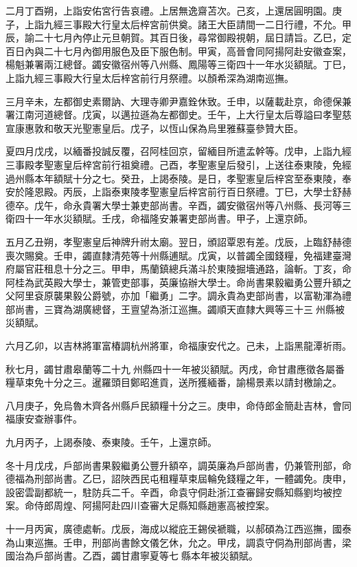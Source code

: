 \begin{pinyinscope}
二月丁酉朔，上詣安佑宮行告哀禮。上居無逸齋苫次。己亥，上還居圓明園。庚子，上詣九經三事殿大行皇太后梓宮前供奠。諸王大臣請間一二日行禮，不允。甲辰，諭二十七月內停止元旦朝賀。其百日後，尋常御殿視朝，屆日請旨。乙巳，定百日內與二十七月內御用服色及臣下服色制。甲寅，高晉會同阿揚阿赴安徽查案，楊魁兼署兩江總督。蠲安徽宿州等八州縣、鳳陽等三衛四十一年水災額賦。丁巳，上詣九經三事殿大行皇太后梓宮前行月祭禮。以顏希深為湖南巡撫。

三月辛未，左都御史素爾訥、大理寺卿尹嘉銓休致。壬申，以薩載赴京，命德保兼署江南河道總督。戊寅，以邁拉遜為左都御史。壬午，上大行皇太后尊謚曰孝聖慈宣康惠敦和敬天光聖憲皇后。戊子，以恆山保為烏里雅蘇臺參贊大臣。

夏四月戊戌，以緬番投誠反覆，召阿桂回京，留緬目所遣孟幹等。戊申，上詣九經三事殿孝聖憲皇后梓宮前行祖奠禮。己酉，孝聖憲皇后發引，上送往泰東陵，免經過州縣本年額賦十分之七。癸丑，上謁泰陵。是日，孝聖憲皇后梓宮至泰東陵，奉安於隆恩殿。丙辰，上詣泰東陵孝聖憲皇后梓宮前行百日祭禮。丁巳，大學士舒赫德卒。戊午，命永貴署大學士兼吏部尚書。辛酉，蠲安徽宿州等八州縣、長河等三衛四十一年水災額賦。壬戌，命福隆安兼署吏部尚書。甲子，上還京師。

五月乙丑朔，孝聖憲皇后神牌升祔太廟。翌日，頒詔覃恩有差。戊辰，上臨舒赫德喪次賜奠。壬申，蠲直隸清苑等十州縣逋賦。戊寅，以普蠲全國錢糧，免福建臺灣府屬官莊租息十分之三。甲申，馬蘭鎮總兵滿斗於東陵掘墻通路，論斬。丁亥，命阿桂為武英殿大學士，兼管吏部事，英廉協辦大學士。命尚書果毅繼勇公豐升額之父阿里袞原襲果毅公爵號，亦加「繼勇」二字。調永貴為吏部尚書，以富勒渾為禮部尚書，三寶為湖廣總督，王亶望為浙江巡撫。蠲順天直隸大興等三十三州縣被災額賦。

六月乙卯，以吉林將軍富椿調杭州將軍，命福康安代之。己未，上詣黑龍潭祈雨。

秋七月，蠲甘肅皋蘭等二十九州縣四十一年被災額賦。丙戌，命甘肅應徵各屬番糧草束免十分之三。暹羅頭目鄭昭進貢，送所獲緬番，諭楊景素以請封檄諭之。

八月庚子，免烏魯木齊各州縣戶民額糧十分之三。庚申，命侍郎金簡赴吉林，會同福康安查辦事件。

九月丙子，上謁泰陵、泰東陵。壬午，上還京師。

冬十月戊戌，戶部尚書果毅繼勇公豐升額卒，調英廉為戶部尚書，仍兼管刑部，命德福為刑部尚書。乙巳，詔陜西民屯租糧草束屆輪免錢糧之年，一體蠲免。庚申，設密雲副都統一，駐防兵二千。辛酉，命袁守侗赴浙江查審歸安縣知縣劉均被控案。命侍郎周煌、阿揚阿赴四川查審大足縣知縣趙憲高被控案。

十一月丙寅，廣德處斬。戊辰，海成以縱庇王錫侯褫職，以郝碩為江西巡撫，國泰為山東巡撫。壬申，刑部尚書餘文儀乞休，允之。甲戌，調袁守侗為刑部尚書，梁國治為戶部尚書。乙酉，蠲甘肅寧夏等七縣本年被災額賦。


\end{pinyinscope}
